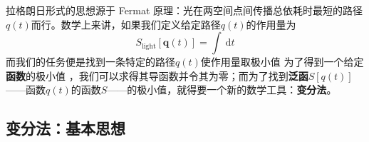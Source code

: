 拉格朗日形式的思想源于 Fermat 原理：光在两空间点间传播总依耗时最短的路径\(q(t)\)而行。数学上来讲，如果我们定义给定路径\(q(t)\)的作用量为
\[
S_{\text{light}}[{\mathbf q}(t)] = \int ~{\mathrm d}t
\]
而我们的任务便是找到一条特定的路径\(q(t)\)使作用量取极小值%
%
为了得到一个给定{\bf 函数}的极小值%
%
，我们可以求得其导函数并令其为零；而为了找到{\bf 泛函}\(S[q(t)]\)——函数\(q(t)\)的函数\(S\)——的极小值，就得要一个新的数学工具：{\bf 变分法}。


\subsection{变分法：基本思想}\label{sec4.1.2}

